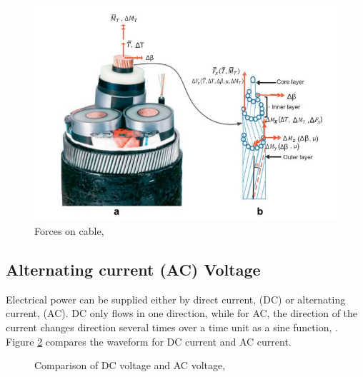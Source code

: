\begin{figure}[H]
\centering
\includegraphics[scale=0.8]{figures/cable}
\caption[$\; \:$Forces on cable]{Forces on cable,  \cite{Nasution2013} }
 \label{fig:cable}
\end{figure}

\subsection{Alternating current (AC) Voltage}
Electrical power can be supplied either by direct current, (DC) or alternating current, (AC). DC only flows in one direction, while for AC, the direction of the current changes direction several times over a time unit as a sine function, \cite{Dale2000}. Figure \ref{fig:acdc} compares the waveform for DC current and AC current.


\begin{figure}[H]
\hfill
{}\hfill
\caption[$\; \:$Comparison of DC voltage and AC voltage]{Comparison of DC voltage and AC voltage, \cite{Dale2000}}
\label{fig:acdc}
\end{figure}

